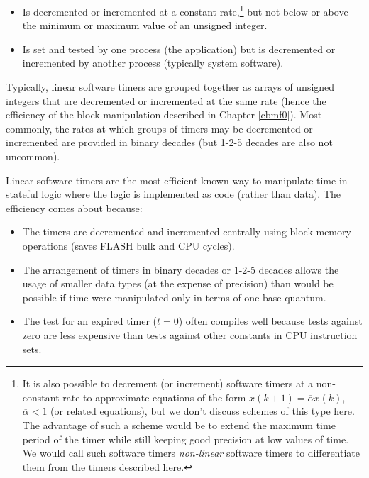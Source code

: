 \begin{itemize}
\item Is decremented or incremented at a constant rate,\footnote{It is also
      possible to decrement (or increment) software timers at a non-constant rate to
      approximate equations of the form $x(k+1) = \overline{\alpha} x(k)$, 
      $\overline{\alpha} < 1$ (or related
      equations), but we don't discuss schemes of this type here.  The advantage
      of such a scheme would be to extend the maximum time period of the timer
      while still keeping good precision at low values of time.  We would call
      such software timers %
      \emph{non-linear} software timers to differentiate them
      from the timers described here.}
      but not
      below or above the minimum or maximum value of an unsigned
      integer.
\item Is set and tested by one process (the application) but 
      is decremented or incremented by another process (typically
      system software).
\end{itemize}

Typically, linear software timers are grouped together as arrays of 
unsigned integers that are decremented or incremented at the same rate (hence the
efficiency of the block manipulation described in Chapter \ref{cbmf0}).
Most commonly, the rates at which groups of timers may be decremented or
incremented are provided in binary decades (but 1-2-5 decades are also
not uncommon).

Linear software timers are the most efficient known way to manipulate time
in stateful logic where the logic is implemented as code (rather than data).
The efficiency comes about because:

\begin{itemize}
\item The timers are decremented and incremented centrally using
      block memory operations (saves FLASH bulk
      and CPU cycles).
\item The arrangement of timers in binary decades or 1-2-5 decades
      allows the usage of smaller data types (at the expense of precision)
      than would be possible if time were manipulated only in terms of one
      base quantum.
\item The test for an expired timer ($t=0$) often compiles well because
      tests against zero are less expensive than tests against other constants
      in CPU instruction sets.
\end{itemize}

